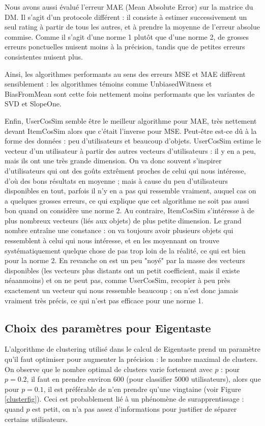 \documentclass[11pt, openany, a4paper]{article}
\begin{document}
		Nous avons aussi évalué l'erreur MAE (Mean Absolute Error) sur la matrice du DM. Il s'agit d'un protocole différent : il consiste à estimer successivement un seul rating à partir de tous les autres, et à prendre la moyenne de l'erreur absolue commise. Comme il s'agit d'une norme 1 plutôt que d'une norme 2, de grosses erreurs ponctuelles nuisent moins à la précision, tandis que de petites erreurs consistentes nuisent plus.
		
		Ainsi, les algorithmes performants au sens des erreurs MSE et MAE diffèrent sensiblement : les algorithmes témoins comme UnbiasedWitness et BiasFromMean sont cette fois nettement moins performants que les variantes de SVD et SlopeOne. 
		
		Enfin, UserCosSim semble être le meilleur algorithme pour MAE, très nettement devant ItemCosSim alors que c'était l'inverse pour MSE. Peut-être est-ce dû à la forme des données : peu d'utilisateurs et beaucoup d'objets. UserCosSim estime le vecteur d'un utilisateur à partir des autres vecteurs d'utilisateurs : il y en a peu, mais ils ont une très grande dimension. On va donc souvent s'inspirer d'utilisateurs qui ont des goûts extrêment proches de celui qui nous intéresse, d'où des bons résultats en moyenne ; mais à cause du peu d'utilisateurs disponibles en tout, parfois il n'y en a pas qui ressemble vraiment, auquel cas on a quelques grosses erreurs, ce qui explique que cet algorithme ne soit pas aussi bon quand on considère une norme 2. Au contraire, ItemCosSim s'intéresse à de plus nombreux vecteurs (liés aux objets) de plus petite dimension. Le grand nombre entraîne une constance : on va toujours avoir plusieurs objets qui ressemblent à celui qui nous intéresse, et en les moyennant on trouve systématiquement quelque chose de pas trop loin de la réalité, ce qui est bien pour la norme 2. En revanche on est un peu "noyé" par la masse des vecteurs disponibles (les vecteurs plus distants ont un petit coefficient, mais il existe néaanmoins) et on ne peut pas, comme UserCosSim, recopier à peu près exactement un vecteur qui nous ressemble beaucoup ; on n'est donc jamais vraiment très précis, ce qui n'est pas efficace pour une norme 1.
		
		
		
		
	\subsection{Choix des paramètres pour Eigentaste}
	
		L'algorithme de clustering utilisé dans le calcul de Eigentaste prend un paramètre qu'il faut optimiser pour augmenter la précision : le nombre maximal de clusters. On observe que le nombre optimal de clusters varie fortement avec $p$ : pour $p=0.2$, il faut en prendre environ $600$ (pour classifier $5000$ utilisateurs), alors que pour $p=0.1$, il est préférable de n'en prendre qu'une vingtaine (voir Figure \ref{clusterfig}). Ceci est probablement lié à un phénomène de surapprentissage : quand $p$ est petit, on n'a pas assez d'informations pour justifier de séparer certains utilisateurs.
		
\end{document}
